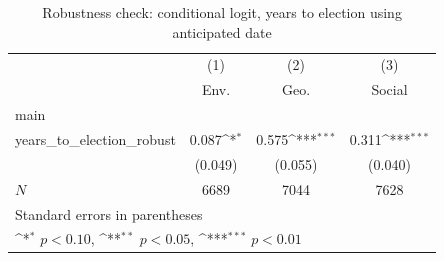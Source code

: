 \begin{table}[htbp]\centering
\def\sym#1{\ifmmode^{#1}\else\(^{#1}\)\fi}
\caption{Robustness check: conditional logit, years to election using anticipated date}
\begin{tabular}{l*{3}{c}}
\toprule
            &\multicolumn{1}{c}{(1)}&\multicolumn{1}{c}{(2)}&\multicolumn{1}{c}{(3)}\\
            &\multicolumn{1}{c}{Env.}&\multicolumn{1}{c}{Geo.}&\multicolumn{1}{c}{Social}\\
\midrule
main        &                     &                     &                     \\
years\_to\_election\_robust&       0.087\sym{*}  &       0.575\sym{***}&       0.311\sym{***}\\
            &     (0.049)         &     (0.055)         &     (0.040)         \\
\midrule
\(N\)       &        6689         &        7044         &        7628         \\
\bottomrule
\multicolumn{4}{l}{\footnotesize Standard errors in parentheses}\\
\multicolumn{4}{l}{\footnotesize \sym{*} \(p<0.10\), \sym{**} \(p<0.05\), \sym{***} \(p<0.01\)}\\
\end{tabular}
\end{table}
